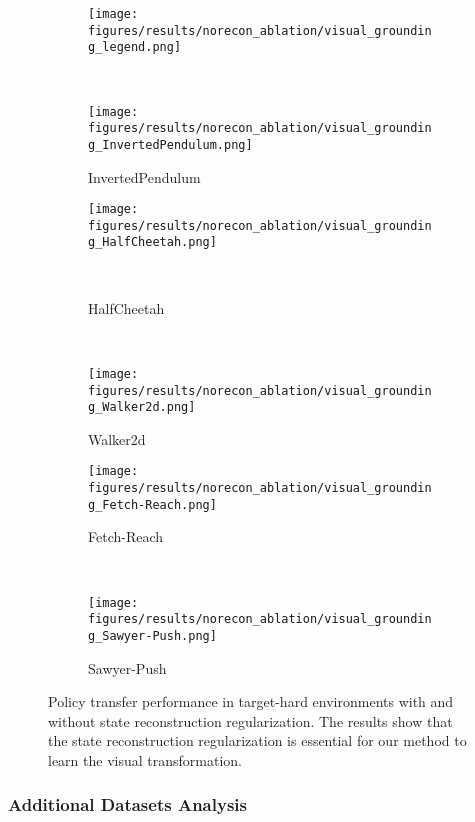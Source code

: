 \begin{figure}[ht]
    \centering
    \begin{subfigure}[t]{0.5\linewidth}
        \centering
        \texttt{[image: figures/results/norecon\_ablation/visual\_grounding\_legend.png]}
    \end{subfigure}
    \\
    \begin{subfigure}[t]{0.45\linewidth}
        \centering
        \texttt{[image: figures/results/norecon\_ablation/visual\_grounding\_InvertedPendulum.png]}
        \caption{InvertedPendulum}
    \end{subfigure}
    \begin{subfigure}[t]{0.45\linewidth}
        \centering
        \texttt{[image: figures/results/norecon\_ablation/visual\_grounding\_HalfCheetah.png]}
        \caption{HalfCheetah}
\    \end{subfigure}
    \\
    \begin{subfigure}[t]{0.45\linewidth}
        \centering
        \texttt{[image: figures/results/norecon\_ablation/visual\_grounding\_Walker2d.png]}
        \caption{Walker2d}
    \end{subfigure}
    \begin{subfigure}[t]{0.45\linewidth}
        \centering
        \texttt{[image: figures/results/norecon\_ablation/visual\_grounding\_Fetch-Reach.png]}
        \caption{Fetch-Reach}
    \end{subfigure}
    \\
    \begin{subfigure}[t]{0.45\linewidth}
        \centering
        \texttt{[image: figures/results/norecon\_ablation/visual\_grounding\_Sawyer-Push.png]}
        \caption{Sawyer-Push}
    \end{subfigure}    
    \caption{
    Policy transfer performance in target-hard environments with and without state reconstruction regularization. The results show that the state reconstruction regularization is essential for our method to learn the visual transformation.
    }
\label{fig:norecon_grounding_ablation}
\end{figure}




\subsubsection{\textbf{Additional Datasets Analysis}}

